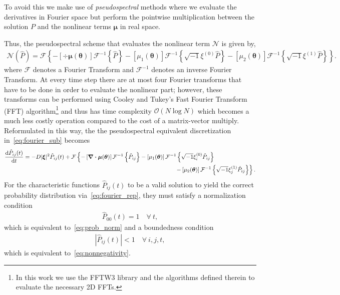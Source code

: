 \documentclass[10pt]{article}
\newcommand{\Phat}{\hat{P}}
\newcommand{\mN}{\bm{\mathcal{N}}}
\newcommand{\mF}{\mathcal{F}}
\newcommand{\mFi}{\mathcal{F}^{-1}}
\begin{document}
To avoid this we make use of \emph{pseudospectral} methods where we evaluate the derivatives in Fourier space but perform the pointwise multiplication between the solution $P$ and the nonlinear terms $\bm{\mu}$ in real space.

Thus, the pseudospectral scheme that evaluates the nonlinear term $\mN$ is given by, 
\begin{align}
    \mN(\Phat) = \mF\left\{-\left[\div{\bm{\mu}(\bm{\theta})}\right]\mFi\left\{\Phat\right\} -\left[\mu_{1}(\bm{\theta})\right]\mFi\left\{\sqrt{-1}\xi^{(0)}\Phat\right\}-\left[\mu_{2}(\bm{\theta})\right]\mFi\left\{\sqrt{-1}\xi^{(1)}\Phat\right\} \right\}.
\end{align}
where $\mF$ denotes a Fourier Transform and $\mFi$ denotes an inverse Fourier Transform. At every time step there are at most four Fourier transforms that have to be done in order to evaluate the nonlinear part; however, these transforms can be performed using Cooley and Tukey's Fast Fourier Transform (FFT) algorithm\footnote{In this work we use the FFTW3 library and the algorithms defined therein to evaluate the necessary 2D FFTs.} and thus has time complexity $\mathcal{O}(N\log N)$ which becomes a much less costly operation compared to the cost of a matrix-vector multiply. Reformulated in this way, the the pseudospectral equivalent discretization in~\eqref{eq:fourier_sub} becomes
\begin{align}
    \dv{\Phat_{ij}(t)}{t} = -D|\bm{\xi}|^{2}\Phat_{ij}(t) + \mF&\left\{-\left[\div{\bm{\mu}(\bm{\theta})}\right]\mFi\left\{\Phat_{ij}\right\} -\left[\mu_{1}(\bm{\theta})\right]\mFi\left\{\sqrt{-1}\xi^{(0)}_{i}\Phat_{ij}\right\}\right.\nonumber\\
    &\hspace{6cm}\left.-\left[\mu_{2}(\bm{\theta})\right]\mFi\left\{\sqrt{-1}\xi^{(1)}_{j}\Phat_{ij}\right\} \right\}.\label{eq:pseudospectral}
\end{align}   
For the characteristic functions $\Phat_{ij}(t)$ to be a valid solution to yield the correct probability distribution via~\eqref{eq:fourier_rep}, they must satisfy a normalization condition
\begin{align}
    \Phat_{00}(t) = 1\quad \forall\ t,
\end{align}
which is equivalent to~\eqref{eq:prob_norm} and a boundedness condition
\begin{align}
    |\Phat_{ij}(t)| < 1\quad\forall\ i,j,t,
\end{align}
which is equivalent to~\eqref{eq:nonnegativity}.
\end{document}
